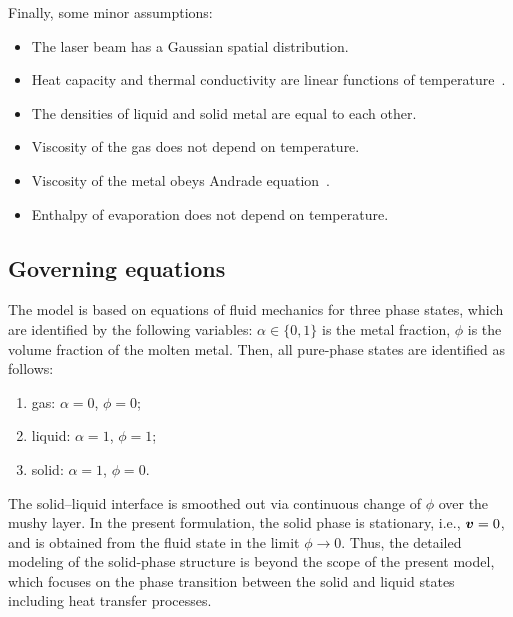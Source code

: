 \documentclass[final]{elsarticle} %
\newcommand{\bv}{\vb*{v}}
\begin{document}
Finally, some minor assumptions:
\begin{itemize}
    \item The laser beam has a Gaussian spatial distribution.
    \item Heat capacity and thermal conductivity are linear functions of temperature~\cite{le2019study}.
    \item The densities of liquid and solid metal are equal to each other.
    \item Viscosity of the gas does not depend on temperature.
    \item Viscosity of the metal obeys Andrade equation~\cite{andrade1930viscosity}.
    \item Enthalpy of evaporation does not depend on temperature.
\end{itemize}

\subsection{Governing equations}

The model is based on equations of fluid mechanics for three phase states,
which are identified by the following variables: $\alpha\in\{0,1\}$ is the metal fraction,
$\phi$ is the volume fraction of the molten metal.
Then, all pure-phase states are identified as follows:
\begin{enumerate}[label=\arabic*)]
    \item gas: $\alpha=0$, $\phi=0$;
    \item liquid: $\alpha=1$, $\phi=1$;
    \item solid: $\alpha=1$, $\phi=0$.
\end{enumerate}
The solid--liquid interface is smoothed out via continuous change of $\phi$ over the mushy layer.
In the present formulation, the solid phase is stationary, i.e., $\bv=0$,
and is obtained from the fluid state in the limit $\phi\to0$.
Thus, the detailed modeling of the solid-phase structure is beyond the scope of the present model,
which focuses on the phase transition between the solid and liquid states including heat transfer processes.
\end{document}

